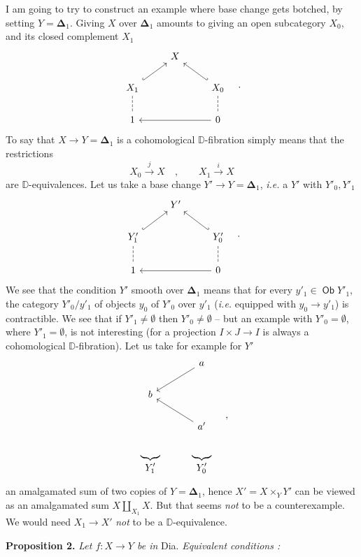 \documentclass[11pt]{article}
\newcommand{\printedpage}[1]{\marginpar{\footnotesize p.~#1}}
\newcommand{\msp}[1]{\marginpar{\footnotesize [#1]}}
\newcommand{\D}{\mathbb{D}}
\newcommand{\Ob}{\mathop{\mathsf{Ob}}}
\newcommand{\Dia}{\textsf{Dia}}
\begin{document}
\hspace*{\parindent}I am going to try to construct an example where base change gets botched, by setting $Y = \boldsymbol{\Delta}_1$. Giving $X$ over $\boldsymbol{\Delta}_1$ amounts to giving an open subcategory $X_0$, and its closed complement $X_1$
\[
\begin{tikzcd}
& X & \\
X_1 \arrow[ur, hook] \arrow[d, dash, dashed] & & X_0 \arrow[ul, hook'] \arrow[d, dash, dashed] \\
1 & & 0 \arrow[ll]
\end{tikzcd}
\quad .
\]
To say that $X \to Y = \boldsymbol{\Delta}_1$ is a cohomological $\D$-fibration simply means
\msp{page 78}
that the restrictions
\[
X_0 \overset{j}{\longrightarrow} X \quad , \qquad X_1 \overset{i}{\longrightarrow} X
\]
are $\D$-equivalences. Let us take a base change $Y' \to Y = \boldsymbol{\Delta}_1$, \textit{i.e.} a $Y'$ with $Y'_0, Y'_1$
\[
\begin{tikzcd}
& Y' & \\
Y'_1 \arrow[ur, hook] \arrow[d, dash, dashed] & & Y'_0 \arrow[ul, hook'] \arrow[d, dash, dashed] \\
1 & & 0 \arrow[ll]
\end{tikzcd}
\quad .
\]
We see that the condition $Y'$ smooth over $\boldsymbol{\Delta}_1$ means that for every $y'_1 \in \Ob Y'_1$, the category $Y'_0/y'_1$ of objects $y_0$ of $Y'_0$ over $y'_1$ (\textit{i.e.} equipped with $y_0 \to y'_1$) is contractible. We see that if $Y'_1 \neq \emptyset$ then $Y'_0 \neq \emptyset$ -- but an example with $Y'_0 = \emptyset$, where $Y'_1 = \emptyset$, is not interesting
\printedpage{48}
(for a projection $I \times J \to I$ is always a cohomological $\D$-fibration). Let us take for example for $Y'$
\[
\begin{tikzcd}
& a \arrow[dl] \\
b & \\
& a' \arrow[ul] \\
\underbrace{\qquad}_{\displaystyle Y'_1} & \underbrace{\qquad}_{\displaystyle Y'_0}
\end{tikzcd}
\quad ,
\]
an amalgamated sum of two copies of $Y = \boldsymbol{\Delta}_1$, hence $X' = X \times_Y Y'$ can be viewed as an amalgamated sum $X \amalg_{X_1} X$. But that seems \textit{not} to be a counterexample. We would need $X_1 \to X'$ \textit{not} to be a $\D$-equivalence.

\msp{page 79}

\textbf{Proposition 2.} \textit{Let $f : X \to Y$ be in} \Dia. \textit{Equivalent conditions :}
\end{document}
